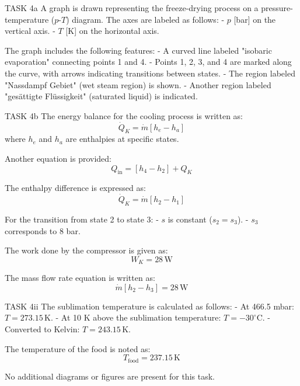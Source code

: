 TASK 4a  
A graph is drawn representing the freeze-drying process on a pressure-temperature (\( p \)-\( T \)) diagram. The axes are labeled as follows:  
- \( p \) [bar] on the vertical axis.  
- \( T \) [K] on the horizontal axis.  

The graph includes the following features:  
- A curved line labeled "isobaric evaporation" connecting points 1 and 4.  
- Points 1, 2, 3, and 4 are marked along the curve, with arrows indicating transitions between states.  
- The region labeled "Nassdampf Gebiet" (wet steam region) is shown.  
- Another region labeled "gesättigte Flüssigkeit" (saturated liquid) is indicated.  

TASK 4b  
The energy balance for the cooling process is written as:  
\[
\dot{Q}_K = \dot{m} \left[ h_e - h_a \right]
\]  
where \( h_e \) and \( h_a \) are enthalpies at specific states.  

Another equation is provided:  
\[
Q_{\text{in}} = \left[ h_4 - h_2 \right] + Q_K
\]  

The enthalpy difference is expressed as:  
\[
\dot{Q}_K = \dot{m} \left[ h_2 - h_1 \right]
\]  

For the transition from state 2 to state 3:  
- \( s \) is constant (\( s_2 = s_3 \)).  
- \( s_3 \) corresponds to 8 bar.  

The work done by the compressor is given as:  
\[
W_K = 28 \, \text{W}
\]  

The mass flow rate equation is written as:  
\[
\dot{m} \left[ h_2 - h_3 \right] = 28 \, \text{W}
\]  

TASK 4ii  
The sublimation temperature is calculated as follows:  
- At 466.5 mbar: \( T = 273.15 \, \text{K} \).  
- At 10 K above the sublimation temperature: \( T = -30^\circ\text{C} \).  
- Converted to Kelvin: \( T = 243.15 \, \text{K} \).  

The temperature of the food is noted as:  
\[
T_{\text{food}} = 237.15 \, \text{K}
\]  

No additional diagrams or figures are present for this task.
